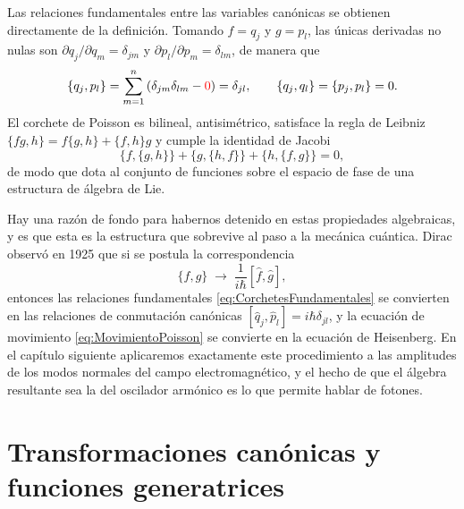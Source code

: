         Las relaciones fundamentales entre las variables canónicas se obtienen directamente de la definición. Tomando $f = q_{j}$ y $g = p_{l}$, las únicas derivadas no nulas son $\partial q_{j}/\partial q_{m} = \delta_{jm}$ y $\partial p_{l}/\partial p_{m} = \delta_{lm}$, de manera que
        \begin{equation}\label{eq:CorchetesFundamentales}
            \{q_{j},p_{l}\} = \sum_{m=1}^{n}\left(\delta_{jm}\delta_{lm} - \textcolor{red}{0}\right) = \delta_{jl},
            \qquad
            \{q_{j},q_{l}\} = \{p_{j},p_{l}\} = 0 .
        \end{equation}
        El corchete de Poisson es bilineal, antisimétrico, satisface la regla de Leibniz $\{fg,h\} = f\{g,h\} + \{f,h\}g$ y cumple la identidad de Jacobi
        \begin{equation}\label{eq:IdentidadJacobi}
            \{f,\{g,h\}\} + \{g,\{h,f\}\} + \{h,\{f,g\}\} = 0,
        \end{equation}
        de modo que dota al conjunto de funciones sobre el espacio de fase de una estructura de álgebra de Lie.

        Hay una razón de fondo para habernos detenido en estas propiedades algebraicas, y es que esta es la estructura que sobrevive al paso a la mecánica cuántica. Dirac observó en 1925 que si se postula la correspondencia
        \begin{equation}\label{eq:CorrespondenciaDirac}
            \{f,g\} \;\longrightarrow\; \frac{1}{i\hbar}\left[\hat{f},\hat{g}\right],
        \end{equation}
        entonces las relaciones fundamentales \eqref{eq:CorchetesFundamentales} se convierten en las relaciones de conmutación canónicas $[\hat{q}_{j},\hat{p}_{l}] = i\hbar\delta_{jl}$, y la ecuación de movimiento \eqref{eq:MovimientoPoisson} se convierte en la ecuación de Heisenberg. En el capítulo siguiente aplicaremos exactamente este procedimiento a las amplitudes de los modos normales del campo electromagnético, y el hecho de que el álgebra resultante sea la del oscilador armónico es lo que permite hablar de fotones.

\section{Transformaciones canónicas y funciones generatrices}

